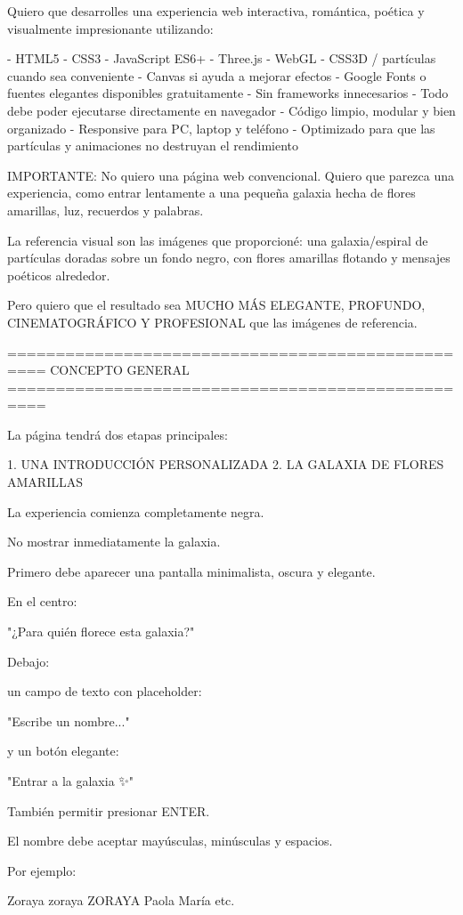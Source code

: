 Quiero que desarrolles una experiencia web interactiva, romántica, poética y visualmente impresionante utilizando:

- HTML5
- CSS3
- JavaScript ES6+
- Three.js
- WebGL
- CSS3D / partículas cuando sea conveniente
- Canvas si ayuda a mejorar efectos
- Google Fonts o fuentes elegantes disponibles gratuitamente
- Sin frameworks innecesarios
- Todo debe poder ejecutarse directamente en navegador
- Código limpio, modular y bien organizado
- Responsive para PC, laptop y teléfono
- Optimizado para que las partículas y animaciones no destruyan el rendimiento

IMPORTANTE:
No quiero una página web convencional.
Quiero que parezca una experiencia, como entrar lentamente a una pequeña galaxia hecha de flores amarillas, luz, recuerdos y palabras.

La referencia visual son las imágenes que proporcioné: una galaxia/espiral de partículas doradas sobre un fondo negro, con flores amarillas flotando y mensajes poéticos alrededor.

Pero quiero que el resultado sea MUCHO MÁS ELEGANTE, PROFUNDO, CINEMATOGRÁFICO Y PROFESIONAL que las imágenes de referencia.

==================================================
CONCEPTO GENERAL
==================================================

La página tendrá dos etapas principales:

1. UNA INTRODUCCIÓN PERSONALIZADA
2. LA GALAXIA DE FLORES AMARILLAS

La experiencia comienza completamente negra.

No mostrar inmediatamente la galaxia.

Primero debe aparecer una pantalla minimalista, oscura y elegante.

En el centro:

"¿Para quién florece esta galaxia?"

Debajo:

un campo de texto con placeholder:

"Escribe un nombre..."

y un botón elegante:

"Entrar a la galaxia ✨"

También permitir presionar ENTER.

El nombre debe aceptar mayúsculas, minúsculas y espacios.

Por ejemplo:

Zoraya
zoraya
ZORAYA
Paola
María
etc.

